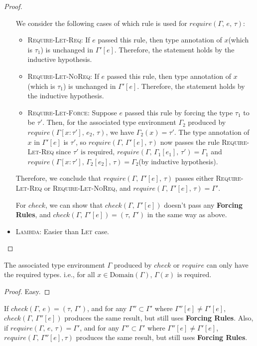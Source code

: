 \documentclass[peerreview, 10pt]{IEEEtran}
\newcommand{\checktype}[4]{\ensuremath{{check}(#1,\,#2)=(#3,\,#4)}}
\newcommand{\requiretype}[4]{\ensuremath{{require}(#1,\,#2,\,#3)=#4}}
\newcommand{\required}[1]{\ensuremath{#1\text{ is required}}}
\newcommand{\domain}[1]{\ensuremath{\text{Domain}(#1)}}
\begin{document}
\begin{proof}
\begin{itemize}
        We consider the following cases of which rule is used for $require(\Gamma,\,e,\,\tau)$:
        \begin{itemize}
            \item \textsc{Require-Let-Req}: If $e$ passed this rule, then type annotation of $x$(which is $\tau_1$) is unchanged in $\Gamma'[e]$. Therefore, the statement holds by the inductive hypothesis.
            \item \textsc{Require-Let-NoReq}: If $e$ passed this rule, then type annotation of $x$(which is $\tau_1$) is unchanged in $\Gamma'[e]$. Therefore, the statement holds by the inductive hypothesis.
            \item \textsc{Require-Let-Force}: Suppose $e$ passed this rule by forcing the type $\tau_1$ to be $\tau'$. Then, for the associated type environment $\Gamma_2$ produced by $require(\Gamma[x:\tau'],\,e_2,\,\tau)$, we have $\Gamma_2(x)=\tau'$. The type annotation of $x$ in $\Gamma'[e]$ is $\tau'$, so $require(\Gamma,\,\Gamma'[e],\,\tau)$ now passes the rule \textsc{Require-Let-Req} since $\required{\tau'}$, \requiretype{\Gamma}{\Gamma_1[e_1]}{\tau'}{\Gamma_1} and \requiretype{\Gamma[x:\tau']}{\Gamma_2[e_2]}{\tau}{\Gamma_2}(by inductive hypothesis).
        \end{itemize}

        Therefore, we conclude that $require(\Gamma,\,\Gamma'[e],\,\tau)$ passes either \textsc{Require-Let-Req} or \textsc{Require-Let-NoReq}, and $\requiretype{\Gamma}{\Gamma'[e]}{\tau}{\Gamma'}$.

        For $check$, we can show that $check(\Gamma,\,\Gamma'[e])$ doesn't pass any \textbf{Forcing Rules}, and $\checktype{\Gamma}{\Gamma'[e]}{\tau}{\Gamma'}$ in the same way as above.
        \item \textsc{Lambda}: Easier than \textsc{Let} case.
    \end{itemize}
\end{proof}

\begin{lemma}
    \label{lem:required}
    The associated type environment $\Gamma$ produced by $check$ or $require$ can only have the required types. i.e., for all $x\in\domain{\Gamma}$, $\required{\Gamma(x)}$.
\end{lemma}

\begin{proof}
    Easy.
\end{proof}

\begin{theorem}
    \label{thm:check-apply-force}
    If $\checktype{\Gamma}{e}{\tau}{\Gamma'}$, and for any $\Gamma''\subset\Gamma'$ where $\Gamma''[e]\neq\Gamma'[e]$, $check(\Gamma,\,\Gamma''[e])$ produces the same result, but still uses \textbf{Forcing Rules}. Also, if $\requiretype{\Gamma}{e}{\tau}{\Gamma'}$, and for any $\Gamma''\subset\Gamma'$ where $\Gamma''[e]\neq\Gamma'[e]$, $require(\Gamma,\,\Gamma''[e], \tau)$ produces the same result, but still uses \textbf{Forcing Rules}.
\end{theorem}
\end{document}
